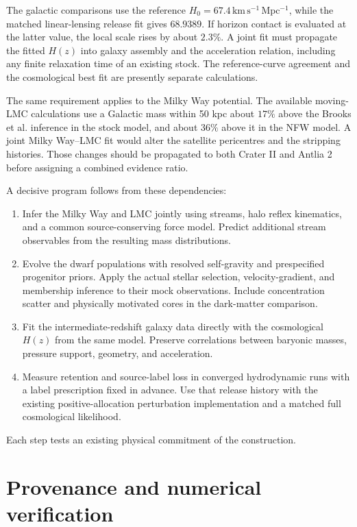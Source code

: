 The galactic comparisons use the reference
$H_0=67.4\,\mathrm{km\,s^{-1}\,Mpc^{-1}}$, while the matched linear-lensing
release fit gives $68.9389$. If horizon contact is evaluated at the latter
value, the local scale rises by about $2.3\%$. A joint fit must propagate
the fitted $H(z)$ into galaxy assembly and the acceleration relation,
including any finite relaxation time of an existing stock. The
reference-curve agreement and the cosmological best fit are presently
separate calculations.

The same requirement applies to the Milky Way potential. The available
moving-LMC calculations use a Galactic mass within 50 kpc about $17\%$
above the Brooks et al. inference in the stock model, and about $36\%$
above it in the NFW model. A joint Milky Way--LMC fit would alter the
satellite pericentres and the stripping histories. Those changes should
be propagated to both Crater II and Antlia 2 before assigning a combined
evidence ratio. \cite{brooks}

A decisive program follows from these dependencies:
\begin{enumerate}
\item Infer the Milky Way and LMC jointly using streams, halo reflex
kinematics, and a common source-conserving force model. Predict additional
stream observables from the resulting mass distributions.
\item Evolve the dwarf populations with resolved self-gravity and
prespecified progenitor priors. Apply the actual stellar selection,
velocity-gradient, and membership inference to their mock observations.
Include concentration scatter and physically motivated cores in the
dark-matter comparison.
\item Fit the intermediate-redshift galaxy data directly with the
cosmological $H(z)$ from the same model. Preserve correlations between
baryonic masses, pressure support, geometry, and acceleration.
\item Measure retention and source-label loss in converged hydrodynamic
runs with a label prescription fixed in advance. Use that release history
with the existing positive-allocation perturbation implementation and
a matched full cosmological likelihood.
\end{enumerate}
Each step tests an existing physical commitment of the construction.

\appendix
\section{Provenance and numerical verification}

